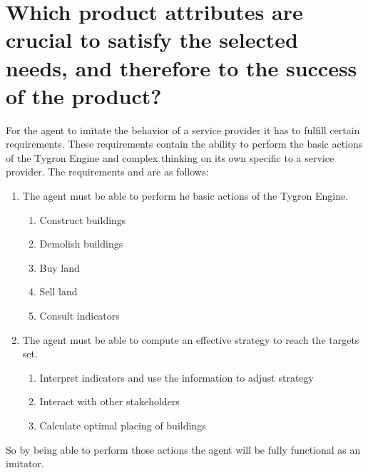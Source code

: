 \section{Which product attributes are crucial to satisfy the selected needs, and therefore to the success of the product?}

For the agent to imitate the behavior of a service provider it has to fulfill certain requirements. These requirements contain the ability to perform the basic actions of the Tygron Engine and complex thinking on its own specific to a service provider. The requirements and are as follows:
\begin{enumerate}
\item The agent must be able to perform he basic actions of the Tygron Engine.
	\begin{enumerate}
	\item Construct buildings
	\item Demolish buildings
	\item Buy land
	\item Sell land
	\item Consult indicators
	\end{enumerate}

\item The agent must be able to compute an effective strategy to reach the targets set.
	\begin{enumerate}
	\item Interpret indicators and use the information to adjust strategy
	\item Interact with other stakeholders
	\item Calculate optimal placing of buildings
	\end{enumerate}

\end{enumerate} \newline

So by being able to perform those actions the agent will be fully functional as an imitator.
